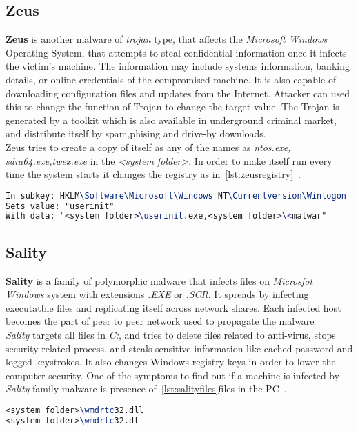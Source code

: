\subsection{Zeus}
\label{sub:Zeus}
\textbf{Zeus} is another malware of \emph{trojan} type, that affects the \emph{Microsoft Windows} Operating System, that attempts to steal confidential information once it infects the victim's machine.
The information may include systems information, banking details, or online credentials of the compromised machine.
It is also capable of downloading configuration files and updates from the Internet. Attacker can used this to change the function of Trojan to change the target value. The Trojan is generated by a toolkit which is also available in underground criminal market, and distribute itself by spam,phising and drive-by downloads.~\cite[Trojan.Zbot]{zeus}.\\
Zeus tries to create a copy of itself as any of the names as \emph{ntos.exe, sdra64.exe,twex.exe} in the \textit{<system folder>}.
In order to make itself run every time the system starts it changes the registry as in~\autoref{lst:zeusregistry}~\cite[Win32/Zbot]{zeusmicro}.
\begin{lstlisting}[language=TeX,caption={Registry key modified by Zeus Trojan to autostart},label={lst:zeusregistry}]
In subkey: HKLM\Software\Microsoft\Windows NT\Currentversion\Winlogon
Sets value: "userinit"
With data: "<system folder>\userinit.exe,<system folder>\<malwar"
\end{lstlisting}
\subsection{Sality}
\label{sub:Sality}
\textbf{Sality} is a family of polymorphic malware that infects files on \emph{Microsfot Windows} system with extensions \emph{.EXE} or \emph{.SCR}.
It spreads by infecting executatble files and replicating itself across network shares.
Each infected host becomes the part of peer to peer network used to propagate the malware~\cite[Sality]{salitysym} \\
\emph{Sality} targets all files in \emph{C:}, and tries to delete files related to anti-virus, stops security related process, and steals sensitive information like cached password and logged keystrokes.
It also changes Windows registry keys in order to lower the computer security.
One of the symptoms to find out if a machine is infected by \emph{Sality} family malware is presence of~\autoref{lst:salityfiles}files in the PC~\cite[Win32/Sality]{salitymicro}.
\begin{lstlisting}[language=TeX,caption={Files created by Sality in the infected machine},label={lst:salityfiles}]
<system folder>\wmdrtc32.dll
<system folder>\wmdrtc32.dl_
\end{lstlisting}
